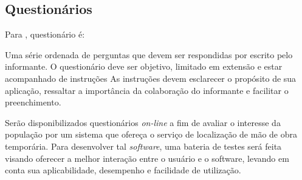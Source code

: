 \subsection{Questionários}

\par Para , questionário é:

\begin{citacao}
	Uma série ordenada de perguntas que devem ser respondidas por escrito pelo informante. O questionário deve ser objetivo, limitado em extensão e estar acompanhado de instruções As instruções devem esclarecer o propósito de sua aplicação, ressaltar a importância da colaboração do informante e facilitar o preenchimento.
\end{citacao}



\par Serão disponibilizados questionários \textit{on-line} a fim de avaliar o interesse da população por um sistema que ofereça o serviço de localização de mão de obra temporária. Para desenvolver tal \textit{software}, uma bateria de testes será feita visando oferecer a melhor interação entre o usuário e o software, levando em conta sua aplicabilidade, desempenho e facilidade de utilização.





